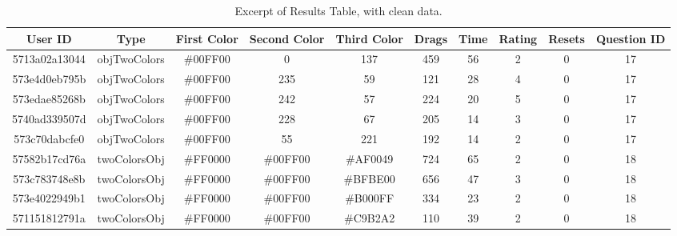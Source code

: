 \begin{table}[htbp]
  \resizebox{\textwidth}{!} {
  \begin{tabular} {|c|c|c|c|c|c|c|c|c|c|}
    \hline
    User ID & Type & First Color & Second Color & Third Color & Drags & Time & Rating & Resets & Question ID \\ \hline \hline
    5713a02a13044 & objTwoColors & \#00FF00 & 0 & 137 & 459 & 56 & 2 & 0 & 17 \\ \hline
    573e4d0eb795b & objTwoColors & \#00FF00 & 235 & 59 & 121 & 28 & 4 & 0 & 17 \\ \hline
    573edae85268b & objTwoColors & \#00FF00 & 242 & 57 & 224 & 20 & 5 & 0 & 17 \\ \hline
    5740ad339507d & objTwoColors & \#00FF00 & 228 & 67 & 205 & 14 & 3 & 0 & 17 \\ \hline
    573c70dabcfe0 & objTwoColors & \#00FF00 & 55 & 221 & 192 & 14 & 2 & 0 & 17 \\ \hline
    57582b17cd76a & twoColorsObj & \#FF0000 & \#00FF00 & \#AF0049 & 724 & 65 & 2 & 0 & 18 \\ \hline
    573c783748e8b & twoColorsObj & \#FF0000 & \#00FF00 & \#BFBE00 & 656 & 47 & 3 & 0 & 18 \\ \hline
    573e4022949b1 & twoColorsObj & \#FF0000 & \#00FF00 & \#B000FF & 334 & 23 & 2 & 0 & 18 \\ \hline
    571151812791a & twoColorsObj & \#FF0000 & \#00FF00 & \#C9B2A2 & 110 & 39 & 2 & 0 & 18 \\
    \hline
  \end{tabular}}
  \caption[Excerpt of Clean "Results" Table]{Excerpt of Results Table, with clean data.}
  \label{table:csv_resultsclean}
\end{table}
